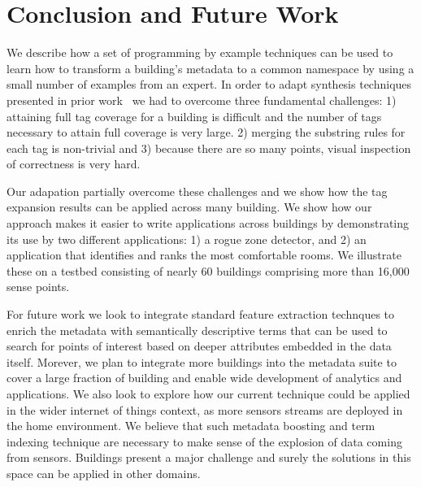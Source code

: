 \section{Conclusion and Future Work}

We describe how a set of programming by example techniques can be used to
learn how to transform a building's metadata 
to a common namespace by using a small number of examples from an expert. 
In order to adapt synthesis techniques presented in prior work~\cite{} we had to overcome
three fundamental challenges: 1) attaining full tag coverage for a building
is difficult and the number of tags necessary to attain full coverage is very large.
2) merging the substring rules for each tag is non-trivial and 3) because there are so
many points, visual inspection of correctness is very hard.

Our adapation partially overcome these challenges and we show how the tag expansion results can
be applied across many building.
We show how our approach makes it easier to write applications across buildings by
demonstrating its use by two different applications: 1) a rogue zone detector, and 
2) an application that identifies and ranks the most comfortable
rooms. We illustrate these on a testbed consisting of nearly 60 buildings comprising more 
than 16,000 sense points. 





For future work we look to integrate standard feature extraction technques to enrich the metadata
with semantically descriptive terms that can be used to search for points of interest based on
deeper attributes embedded in the data itself.  Morever, we plan to integrate more buildings
into the metadata suite to cover a large fraction of building and enable wide development
of analytics and applications.  We also look to explore how our current technique could be applied in the 
wider internet of things context, as more sensors streams are deployed in the home environment.
We believe that such metadata boosting and term indexing technique are necessary to make sense of
the explosion of data coming from sensors.  Buildings present a major challenge and surely the solutions
in this space can be applied in other domains.


